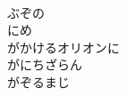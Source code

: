 \documentclass[10pt,b5j]{tarticle} %
\begin{document}
\begin{enumerate}
\begin{minipage}[c]{\blocksize}
        \vspace{\linespace}
        \item~\\
        ぶぞの\\
        にめ\\
        がかけるオリオンに\\
        がにちざらん\\
        がぞるまじ
    
    \end{minipage}
\end{enumerate} %
\end{document}
